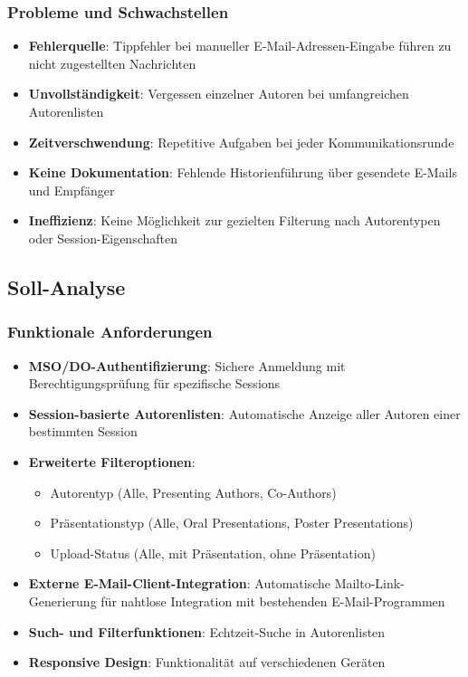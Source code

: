 \documentclass[11pt,a4paper]{article}
\begin{document}
\subsubsection{Probleme und Schwachstellen}
\begin{itemize}
    \item \textbf{Fehlerquelle}: Tippfehler bei manueller E-Mail-Adressen-Eingabe führen zu nicht zugestellten Nachrichten
    \item \textbf{Unvollständigkeit}: Vergessen einzelner Autoren bei umfangreichen Autorenlisten
    \item \textbf{Zeitverschwendung}: Repetitive Aufgaben bei jeder Kommunikationsrunde
    \item \textbf{Keine Dokumentation}: Fehlende Historienführung über gesendete E-Mails und Empfänger
    \item \textbf{Ineffizienz}: Keine Möglichkeit zur gezielten Filterung nach Autorentypen oder Session-Eigenschaften
\end{itemize}

\subsection{Soll-Analyse}

\subsubsection{Funktionale Anforderungen}
\begin{itemize}
    \item \textbf{MSO/DO-Authentifizierung}: Sichere Anmeldung mit Berechtigungsprüfung für spezifische Sessions
    \item \textbf{Session-basierte Autorenlisten}: Automatische Anzeige aller Autoren einer bestimmten Session
    \item \textbf{Erweiterte Filteroptionen}:
    \begin{itemize}
        \item Autorentyp (Alle, Presenting Authors, Co-Authors)
        \item Präsentationstyp (Alle, Oral Presentations, Poster Presentations)
        \item Upload-Status (Alle, mit Präsentation, ohne Präsentation)
    \end{itemize}
    \item \textbf{Externe E-Mail-Client-Integration}: Automatische Mailto-Link-Generierung für nahtlose Integration mit bestehenden E-Mail-Programmen
    \item \textbf{Such- und Filterfunktionen}: Echtzeit-Suche in Autorenlisten
    \item \textbf{Responsive Design}: Funktionalität auf verschiedenen Geräten
\end{itemize}
\end{document}
